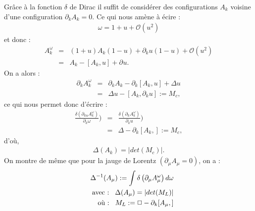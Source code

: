 \documentclass[a4paper,11pt]{article}
\theoremstyle{plain}
\theoremstyle{definition}
\theoremstyle{remark}
\numberwithin{equation}{section}
\numberwithin{equation}{subsection}
\numberwithin{figure}{section}
\begin{document}
Grâce à la fonction $\delta$ de Dirac il suffit de considérer des configurations $A_{k}$ voisine d'une configuration $\partial_{k} A_{k} = 0$. 
Ce qui nous amène à écire : 
\begin{eqnarray}
\omega = 1+ u + \mathcal{O}(u^2)
\end{eqnarray}
et donc :
\begin{eqnarray}
  A^{\omega}_{k} &=& (1+u)A_{k}(1-u) + \partial_{k}u (1-u)+ \mathcal{O}(u^2) \\
                   &=& A_{k} - [A_{k},u] + \partial_{}u  . 
\end{eqnarray}
On a alors :
\begin{eqnarray}
  \partial_{k}A^{\omega}_{k} &=& \partial_{k}A_{k} - \partial_{k}[A_{k},u] + \Delta u \\
			         &=& \Delta u - [A_{k},\partial_{k}u] := M_{c} ,
\end{eqnarray}
ce qui nous permet donc d'écrire :
\begin{eqnarray}
 \frac {\delta(\partial_{ku}A^{\omega}_{k})}{\partial_{k}\omega}) &=& \frac {\delta(\partial_{k}A^{\omega}_{k})}{\partial_{k}u})\\
                                                                       &=& \Delta - \partial_{k}[A_{k},] := M_{c}  ,
\end{eqnarray}
d'où,
\begin{eqnarray}
 \Delta(A_{k}) = \left|det(M_{c})\right|  .
\end{eqnarray}
On montre de même que pour la jauge de Lorentz $(\partial_{\mu} A_{\mu} = 0)$, on a :
\begin{eqnarray}
 && \Delta^{-1}(A_{\mu}):= \int \delta \left(\partial_{\mu}A^{\omega}_{\mu}\right)d\omega \\
 && \text{avec :} \hspace{3mm} \Delta(A_{\mu}) = \left|det(M_{L})\right| \\
 && \text{où :} \hspace{3mm} M_{L} := \Box - \partial_{k}[A_{\mu},]
\end{eqnarray}
\end{document}
